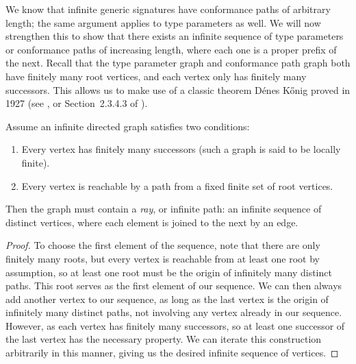 \documentclass[../generics]{subfiles}
\begin{document}
We know that infinite generic signatures have conformance paths of arbitrary length; the same argument applies to type parameters as well. We will now strengthen this to show that there exists an infinite sequence of type parameters or conformance paths of increasing length, where each one is a proper prefix of the next. Recall that the type parameter graph and conformance path graph both have finitely many root vertices, and each vertex only has finitely many successors. This allows us to make use of a classic theorem D\'enes K\H{o}nig proved in 1927 (see \cite{konig}, or Section~2.3.4.3 of \cite{art1}).
\begin{theorem}
Assume an infinite directed graph satisfies two conditions:
\begin{enumerate}
\item Every vertex has finitely many successors (such a graph is said to be locally finite).
\item Every vertex is reachable by a path from a fixed finite set of root vertices.
\end{enumerate}
Then the graph must contain a \emph{ray}, or infinite path: an infinite sequence of distinct vertices, where each element is joined to the next by an edge.
\end{theorem}
\begin{proof}
To choose the first element of the sequence, note that there are only finitely many roots, but every vertex is reachable from at least one root by assumption, so at least one root must be the origin of infinitely many distinct paths. This root serves as the first element of our sequence. We can then always add another vertex to our sequence, as long as the last vertex is the origin of infinitely many distinct paths, not involving any vertex already in our sequence. However, as each vertex has finitely many successors, so at least one successor of the last vertex has the necessary property. We can iterate this construction arbitrarily in this manner, giving us the desired infinite sequence of vertices.
\end{proof}

\newcommand{\SelfAToN}{\AssocConf{Self.A}{N}}
\end{document}
